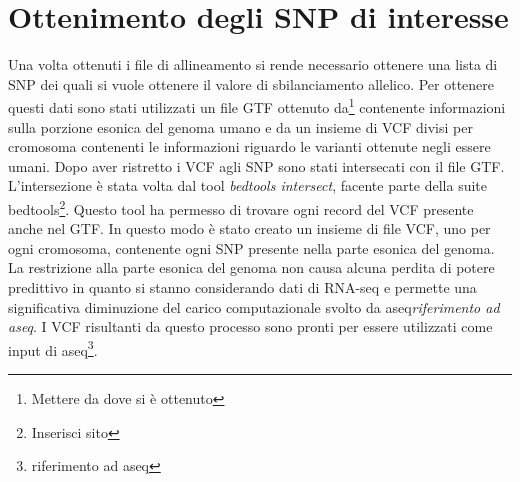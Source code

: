   \section{Ottenimento degli SNP di interesse}
  Una volta ottenuti i file di allineamento si rende necessario ottenere una lista di SNP dei quali si vuole ottenere il valore di sbilanciamento allelico.
  Per ottenere questi dati sono stati utilizzati un file GTF ottenuto da\footnote{Mettere da dove si \`e ottenuto} contenente informazioni sulla porzione esonica del genoma umano e da un insieme di VCF divisi per cromosoma contenenti le informazioni riguardo le varianti ottenute negli essere umani.
  Dopo aver ristretto i VCF agli SNP sono stati intersecati con il file GTF.
  L'intersezione \`e stata volta dal tool \emph{bedtools intersect}, facente parte della suite bedtools\footnote{Inserisci sito}.
  Questo tool ha permesso di trovare ogni record del VCF presente anche nel GTF.
  In questo modo \`e stato creato un insieme di file VCF, uno per ogni cromosoma, contenente ogni SNP presente nella parte esonica del genoma.
  La restrizione alla parte esonica del genoma non causa alcuna perdita di potere predittivo in quanto si stanno considerando dati di RNA-seq e permette una significativa diminuzione del carico computazionale svolto da aseq\emph{riferimento ad aseq}.
  I VCF risultanti da questo processo sono pronti per essere utilizzati come input di aseq\footnote{riferimento ad aseq}.

